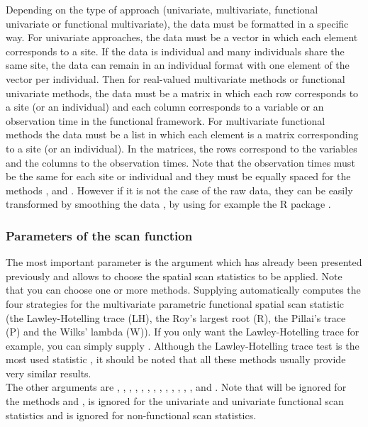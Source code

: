 Depending on the type of approach (univariate, multivariate, functional univariate or functional multivariate), the data must be formatted in a specific way. For univariate approaches, the data must be a vector in which each element corresponds to a site.  If the data is individual and many individuals share the same site, the data can remain in an individual format with one element of the vector per individual.
Then for real-valued multivariate methods or functional univariate methods, the data must be a matrix in which each row corresponds to a site (or an individual) and each column corresponds to a variable or an observation time in the functional framework. For multivariate functional methods the data must be a list in which each element is a matrix corresponding to a site (or an individual). In the matrices, the rows correspond to the variables and the columns to the observation times. Note that the observation times must be the same for each site or individual and they must be equally spaced for the methods ,  and . However if it is not the case of the raw data, they can be easily transformed by smoothing the data \citep{ramsaylivre}, by using for example the R package  \citep{fda}. 


\subsubsection{Parameters of the scan function}
The most important parameter is the  argument which has already been presented previously and allows to choose the spatial scan statistics to be applied. Note that you can choose one or more methods.
Supplying  automatically computes the four strategies for the multivariate parametric functional spatial scan statistic (the Lawley-Hotelling trace (LH), the Roy's largest root (R), the Pillai's trace (P) and the Wilks' lambda (W)). If you only want the Lawley-Hotelling trace for example, you can simply supply . Although the Lawley-Hotelling trace test is the most used statistic \citep{oja}, it should be noted that all these methods usually provide very similar results. \\
The other arguments are , , , , , , , , , , , , ,  and . Note that  will be ignored for the methods  and ,  is ignored for the univariate and univariate functional scan statistics and  is ignored for non-functional scan statistics. \\

